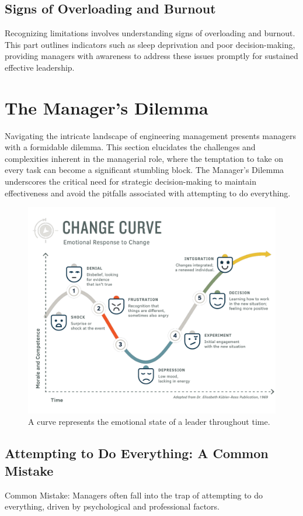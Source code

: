 \documentclass[10pt]{article}
\begin{document}
\subsection{Signs of Overloading and Burnout}
Recognizing limitations involves understanding signs of overloading and burnout. This part outlines indicators such as sleep deprivation and poor decision-making, providing managers with awareness to address these issues promptly for sustained effective leadership.


\section{The Manager's Dilemma}
Navigating the intricate landscape of engineering management presents managers with a formidable dilemma. This section elucidates the challenges and complexities inherent in the managerial role, where the temptation to take on every task can become a significant stumbling block. The Manager's Dilemma underscores the critical need for strategic decision-making to maintain effectiveness and avoid the pitfalls associated with attempting to do everything.

\begin{figure}[h]
    \centering
    \includegraphics[width=1.0\textwidth]{image.png} 
    \caption{A curve represents the emotional state of a leader throughout time.}
    \label{fig:your-label}
\end{figure}

\subsection{Attempting to Do Everything: A Common Mistake}
Common Mistake: Managers often fall into the trap of attempting to do everything, driven by psychological and professional factors.
\end{document}
